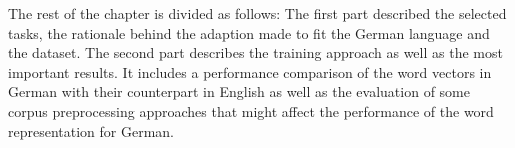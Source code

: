 The rest of the chapter is divided as follows: The first part described the
selected tasks, the rationale behind the adaption made to fit the German
language and the dataset. The second part describes the training approach as well as the most
important results. It includes  a performance comparison of the word
vectors in German with their counterpart in English as well as  the evaluation of  some corpus
preprocessing approaches that might affect the performance of the word
representation for German.














